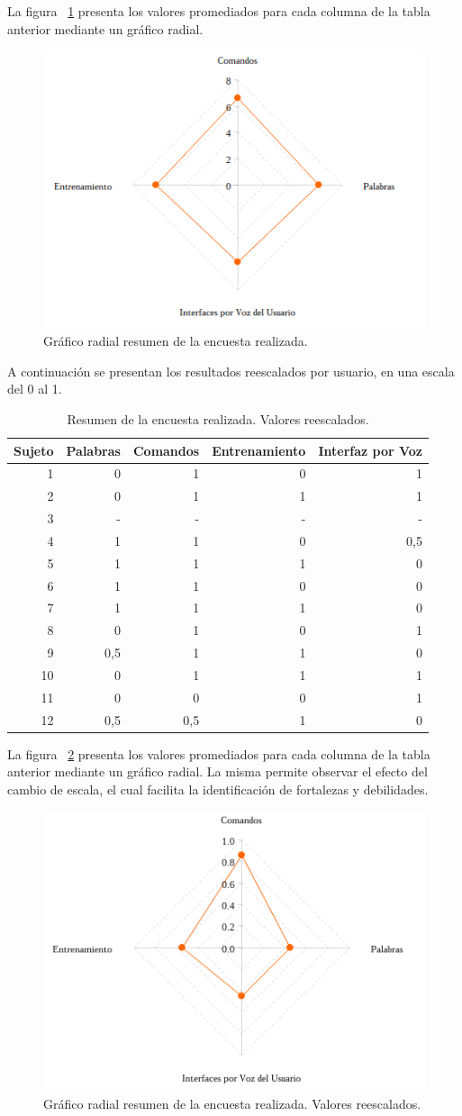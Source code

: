 La figura ~\ref{figure:kiviat-encuesta1} presenta los valores promediados para cada columna
de la tabla anterior mediante un gr\'afico radial.

\begin{figure}[ht]
\centering
\includegraphics[width=0.6\linewidth]{./graphics/kiviat0.png}
\caption{Gr\'afico radial resumen de la encuesta realizada.}
\label{figure:kiviat-encuesta1}
\end{figure}

A continuaci\'on se presentan los resultados reescalados por usuario, en una escala del 0 al 1.


\begin{table}[H] 
\centering
\footnotesize
\begin{tabular}{|r|r|r|r|r|}
\hline
    Sujeto &  Palabras & Comandos & Entrenamiento & Interfaz por Voz \\
    \hline
1 &  0 & 1 & 0 & 1\\
2 &  0 & 1 & 1 & 1\\
3 &  - & - & - & -\\
4 &  1 & 1 & 0 & 0,5\\
5 &  1 & 1 & 1 & 0\\
6 &  1 & 1 & 0 & 0\\
7 &  1 & 1 & 1 & 0\\
8 &  0 & 1 & 0 & 1\\
9 &  0,5 & 1 & 1 & 0\\
10 & 0 & 1 & 1 & 1\\
11 & 0 & 0 & 0 & 1\\
12 & 0,5 & 0,5 & 1 & 0\\
\hline
\end{tabular}
\caption{Resumen de la encuesta realizada. Valores reescalados.}
\label{sec:tabla-encuesta-normalizada}
\end{table}


La figura ~\ref{figure:kiviat-encuesta2} presenta los valores promediados para cada columna
de la tabla anterior mediante un gr\'afico radial. La misma permite observar el efecto del
cambio de escala, el cual facilita la identificaci\'on de fortalezas y debilidades. 

\begin{figure}[ht]
\centering
\includegraphics[width=0.6\linewidth]{./graphics/kiviat.png}
\caption{Gr\'afico radial resumen de la encuesta realizada. Valores reescalados.}
\label{figure:kiviat-encuesta2}
\end{figure}
